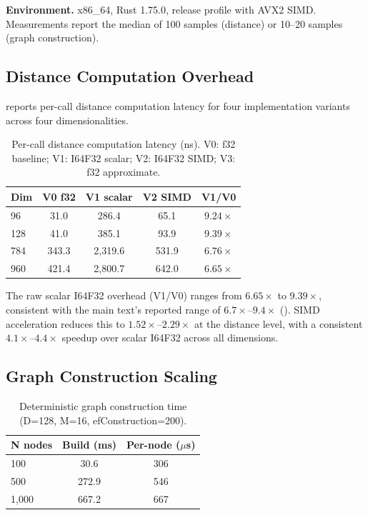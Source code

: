 \documentclass[10pt,journal]{IEEEtran}
\begin{document}
\textbf{Environment.} x86\_64, Rust 1.75.0, release profile with AVX2 SIMD. Measurements report the median of 100 samples (distance) or 10--20 samples (graph construction).

\subsection{Distance Computation Overhead}

 reports per-call distance computation latency for four implementation variants across four dimensionalities.

\begin{table}[h]
  \centering
  \caption{Per-call distance computation latency (ns). V0: f32 baseline; V1: I64F32 scalar; V2: I64F32 SIMD; V3: f32 approximate.}
  \label{tab:bench_distance}
  \footnotesize
  \begin{tabular}{lcccc}
    \toprule
    \textbf{Dim} & \textbf{V0 f32} & \textbf{V1 scalar} & \textbf{V2 SIMD} & \textbf{V1/V0} \\
    \midrule
    96  & 31.0 & 286.4 & 65.1 & $9.24\times$ \\
    128 & 41.0 & 385.1 & 93.9 & $9.39\times$ \\
    784 & 343.3 & 2{,}319.6 & 531.9 & $6.76\times$ \\
    960 & 421.4 & 2{,}800.7 & 642.0 & $6.65\times$ \\
    \bottomrule
  \end{tabular}
\end{table}

The raw scalar I64F32 overhead (V1/V0) ranges from $6.65\times$ to $9.39\times$, consistent with the main text's reported range of $6.7\times$--$9.4\times$ (). SIMD acceleration reduces this to $1.52\times$--$2.29\times$ at the distance level, with a consistent $4.1\times$--$4.4\times$ speedup over scalar I64F32 across all dimensions.

\subsection{Graph Construction Scaling}

\begin{table}[h]
  \centering
  \caption{Deterministic graph construction time (D=128, M=16, efConstruction=200).}
  \label{tab:bench_build}
  \begin{tabular}{lcc}
    \toprule
    \textbf{N nodes} & \textbf{Build (ms)} & \textbf{Per-node ($\mu$s)} \\
    \midrule
    100   & 30.6  & 306  \\
    500   & 272.9 & 546  \\
    1{,}000 & 667.2 & 667  \\
    \bottomrule
  \end{tabular}
\end{table}
\end{document}
